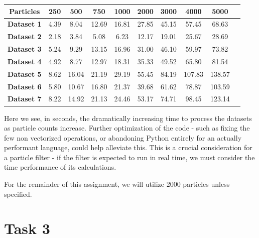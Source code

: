\documentclass{article}
\begin{document}
\begin{table}[H]
    \centering
    \begin{tabular}{|c|c|c|c|c|c|c|c|c|c|}
        \hline
        \textbf{Particles} & \textbf{250} & \textbf{500} & \textbf{750} & \textbf{1000} & \textbf{2000} & \textbf{3000} & \textbf{4000} & \textbf{5000} \\ \hline
        \textbf{Dataset 1} & 4.39         & 8.04         & 12.69        & 16.81         & 27.85         & 45.15         & 57.45         & 68.63         \\ \hline
        \textbf{Dataset 2} & 2.18         & 3.84         & 5.08         & 6.23          & 12.17         & 19.01         & 25.67         & 28.69         \\ \hline
        \textbf{Dataset 3} & 5.24         & 9.29         & 13.15        & 16.96         & 31.00         & 46.10         & 59.97         & 73.82         \\ \hline
        \textbf{Dataset 4} & 4.92         & 8.77         & 12.97        & 18.31         & 35.33         & 49.52         & 65.80         & 81.54         \\ \hline
        \textbf{Dataset 5} & 8.62         & 16.04        & 21.19        & 29.19         & 55.45         & 84.19         & 107.83        & 138.57        \\ \hline
        \textbf{Dataset 6} & 5.80         & 10.67        & 16.80        & 21.37         & 39.68         & 61.62         & 78.87         & 103.59        \\ \hline
        \textbf{Dataset 7} & 8.22         & 14.92        & 21.13        & 24.46         & 53.17         & 74.71         & 98.45         & 123.14        \\ \hline
    \end{tabular}
\end{table}

Here we see, in seconds, the dramatically increasing time to process the datasets as particle counts increase. Further optimization of the code - such as fixing the few non vectorized operations, or abandoning Python entirely for an actually performant language, could help alleviate this. This is a crucial consideration for a particle filter - if the filter is expected to run in real time, we must consider the time performance of its calculations.

For the remainder of this assignment, we will utilize $2000$ particles unless specified.


\section*{Task 3}
\end{document}
